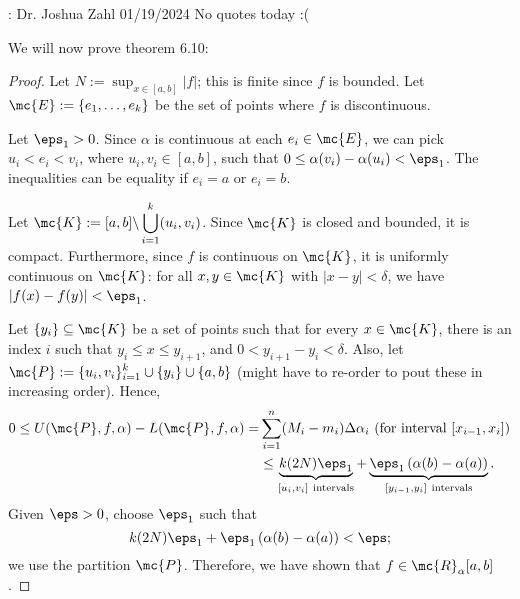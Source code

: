 \begin{nquote}{: Dr. Joshua Zahl 01/19/2024}
	No quotes today :(
\end{nquote}

We will now prove theorem 6.10:
\begin{proof}
	Let \(N:=\displaystyle\sup_{x\in[a,b]}{|f|}\); this is finite since \(f\) is bounded. Let \(\mc{E}:=\{e_1,\dots,e_k\}\) be the set of points where \(f\) is discontinuous.
	
	\medskip
	
	Let \(\eps_1>0\). Since \(\alpha\) is continuous at each \(e_i\in\mc{E}\), we can pick \(u_i<e_i<v_i\), where \(u_i,v_i\in[a,b]\), such that \(0\leq\alpha(v_i)-\alpha(u_i)<\eps_1\). The inequalities can be equality if \(e_i=a\) or \(e_i=b\).
	
	\medskip
	
	Let \(\mc{K}:=[a,b]\backslash\displaystyle\bigcup_{i=1}^k (u_i,v_i)\). Since \(\mc{K}\) is closed and bounded, it is compact. Furthermore, since \(f\) is continuous on \(\mc{K}\), it is uniformly continuous on \(\mc{K}\): for all \(x,y\in\mc{K}\) with \(|x-y|<\delta\), we have \(|f(x)-f(y)|<\eps_1\).
	
	\medskip
	
	Let \(\{y_i\}\subseteq\mc{K}\) be a set of points such that for every \(x\in\mc{K}\), there is an index \(i\) such that \(y_i\leq x\leq y_{i+1}\), and \(0<y_{i+1}-y_i<\delta\). Also, let \(\mc{P}:=\displaystyle\{u_i,v_i\}_{i=1}^k\cup \{y_i\}\cup\{a,b\}\) (might have to re-order to pout these in increasing order). Hence, 
	\begin{align*}
		0\leq U(\mc{P},f,\alpha)-L(\mc{P},f,\alpha)=&\sum_{i=1}^n(M_i-m_i)\Delta\alpha_i~(\text{for interval}~[x_{i-1},x_i])\\
		&\leq \underbrace{k(2N)\eps_1}_{[u_i,v_i]~\text{intervals}}+\underbrace{\eps_1\left(\alpha(b)-\alpha(a)\right)}_{[y_{i-1},y_i]~\text{intervals}}.
	\end{align*}
	Given \(\eps>0\), choose \(\eps_1\) such that 
	\begin{equation*}
		k(2N)\eps_1+\eps_1\left(\alpha(b)-\alpha(a)\right)<\eps;
	\end{equation*}
	we use the partition \(\mc{P}\). Therefore, we have shown that \(f\in\mc{R}_{\alpha}[a,b]\).
\end{proof}

